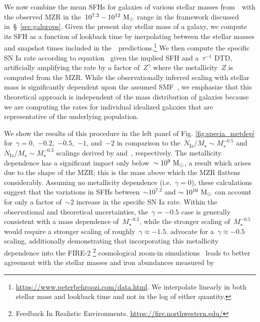 \documentclass[ms.tex]{subfiles}
\begin{document}
We now combine the mean SFHs for galaxies of various stellar masses
from~\um~with the observed MZR in the~$10^{7.2} - 10^{12}~\text{M}_\odot$ range in the
framework discussed in~\S~\ref{sec:galprops}.
Given the present day stellar mass of a galaxy, we compute its SFH as a
function of lookback time by inerpolating between the stellar masses and
snapshot times included in the~\um~predictions.\footnote{
	\url{https://www.peterbehroozi.com/data.html}. We interpolate linearly in
	both stellar mass and lookback time and not in the log of either
	quantity.
}
We then compute the specific SN Ia rate according to equation~
given the implied SFH and a~$\tau^{-1}$ DTD, artificially amplifying the rate
by a factor of~$Z^\gamma$ where the metallicity~$Z$ is computed from the
\citet{Zahid2014} MZR.
While the observationally inferred scaling with stellar mass is significantly
dependent upon the assumed SMF~\citep{Gandhi2022}, we emphasize that this
theoretical approach is independent of the mass distribution of galaxies
because we are computing the rates for individual idealized galaxies that are
representative of the underlying population.
\par
We show the results of this procedure in the left panel of Fig.
\ref{fig:specia_metdep} for~$\gamma = 0$,~$-0.2$,~$-0.5$,~$-1$, and~$-2$ in
comparison to the~$\dot{N}_\text{Ia} / M_\star \sim M_\star^{-0.5}$ and
$\dot{N}_\text{Ia} / M_\star \sim M_\star^{-0.3}$ scalings derived by
\citet{Brown2019} and~\citet{Gandhi2022}, respectively.
The metallicity dependence has a significant impact only below~$\sim 10^9~\text{M}_\odot$,
a result which arises due to the shape of the MZR; this is the mass above which
the MZR flattens considerably.
Assuming no metallicity dependence (i.e.~$\gamma = 0$), these calculations
suggest that the variations in SFHs between~$\sim10^{7.2}$ and
$\sim10^{10}~\text{M}_\odot$ can account for only a factor of~$\sim$2 increase in the
specific SN Ia rate.
Within the observational and theoretical uncertainties, the~$\gamma = -0.5$
case is generally consistent with a mass dependence of~$M_\star^{-0.3}$, while
the stronger scaling of~$M_\star^{-0.5}$ would require a stronger scaling of
roughly~$\gamma \approx -1.5$.
\citet{Gandhi2022} advocate for a~$\gamma \approx -0.5$ scaling, additionally
demonstrating that incorporating this metallicity dependence into the FIRE-2
\footnote{
	Feedback In Realistic Environments.
	\url{https://fire.northwestern.edu/}
} cosmological zoom-in simulations~\citep{Hopkins2018} leads to better
agreement with the stellar masses and iron abundances measured by
\end{document}
